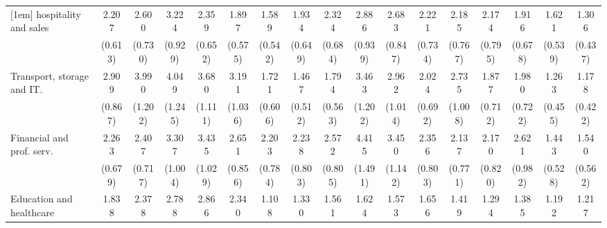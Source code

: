 {\begin{tabular}{l*{16}{c}}
[1em]
hospitality and sales&       2.207\sym{**} &       2.600\sym{***}&       3.224\sym{***}&       2.359\sym{**} &       1.897\sym{*}  &       1.589         &       1.934\sym{*}  &       2.324\sym{**} &       2.886\sym{**} &       2.683\sym{**} &       2.221\sym{*}  &       2.185\sym{*}  &       2.174\sym{*}  &       1.916         &       1.621         &       1.306         \\
                    &     (0.613)         &     (0.730)         &     (0.929)         &     (0.652)         &     (0.575)         &     (0.542)         &     (0.649)         &     (0.684)         &     (0.939)         &     (0.847)         &     (0.734)         &     (0.767)         &     (0.795)         &     (0.678)         &     (0.539)         &     (0.437)         \\
[1em]
Transport, storage and IT.&       2.909\sym{***}&       3.990\sym{***}&       4.049\sym{***}&       3.680\sym{***}&       3.191\sym{***}&       1.721         &       1.467         &       1.794         &       3.463\sym{***}&       2.962\sym{**} &       2.024\sym{*}  &       2.735\sym{**} &       1.877         &       1.980         &       1.263         &       1.178         \\
                    &     (0.867)         &     (1.202)         &     (1.245)         &     (1.111)         &     (1.036)         &     (0.606)         &     (0.512)         &     (0.563)         &     (1.202)         &     (1.014)         &     (0.692)         &     (1.008)         &     (0.712)         &     (0.722)         &     (0.455)         &     (0.422)         \\
[1em]
Financial and prof. serv.&       2.263\sym{**} &       2.407\sym{**} &       3.307\sym{***}&       3.435\sym{***}&       2.651\sym{**} &       2.203\sym{*}  &       2.238\sym{*}  &       2.572\sym{**} &       4.415\sym{***}&       3.450\sym{***}&       2.356\sym{*}  &       2.137\sym{*}  &       2.170\sym{*}  &       2.621\sym{*}  &       1.443         &       1.540         \\
                    &     (0.679)         &     (0.717)         &     (1.004)         &     (1.029)         &     (0.856)         &     (0.784)         &     (0.803)         &     (0.805)         &     (1.491)         &     (1.142)         &     (0.803)         &     (0.771)         &     (0.820)         &     (0.982)         &     (0.528)         &     (0.562)         \\
[1em]
Education and healthcare&       1.838         &       2.378\sym{**} &       2.788\sym{**} &       2.866\sym{**} &       2.340\sym{*}  &       1.108         &       1.330         &       1.561         &       1.624         &       1.573         &       1.656         &       1.419         &       1.294         &       1.385         &       1.192         &       1.217         \\

\end{tabular}}
